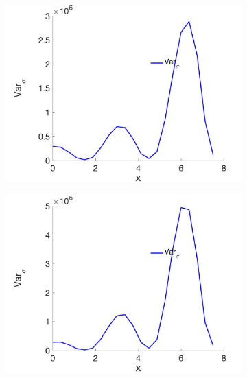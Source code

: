 \documentclass[a4paper]{article}
\begin{document}
\begin{figure} [H]
  \begin{subfigure}{0.45\textwidth}
    \centering
    \includegraphics[width=1.0\linewidth]{p1n20_deviation.png}
    \label{fig:deviation_p1}
  \end{subfigure}
  \begin{subfigure}{0.45\textwidth}
    \centering
    \includegraphics[width=1.0\linewidth]{p2n20_deviation.png}
    \label{fig:deviation_p2}
  \end{subfigure}\\[4ex]
  \begin{subfigure}{0.45\textwidth}
    \centering

\end{subfigure}
\end{figure}
\end{document}
